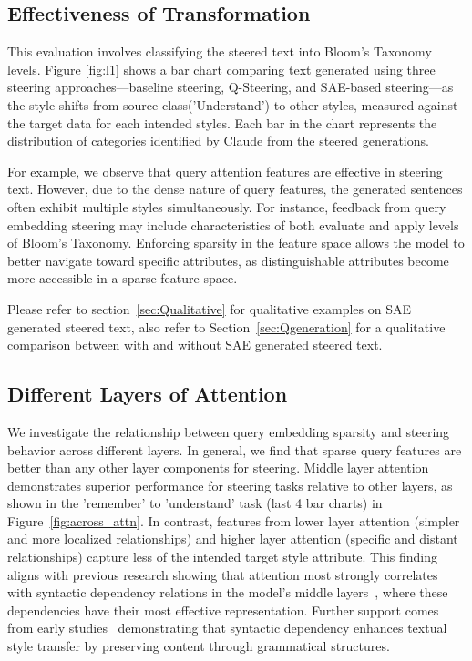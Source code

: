 \subsection{Effectiveness of Transformation}

This evaluation involves classifying the steered text into Bloom's Taxonomy levels. Figure \ref{fig:l1} shows a bar chart comparing text generated using three steering approaches—baseline steering, Q-Steering, and SAE-based steering—as the style shifts from source class('Understand') to other styles, measured against the target data for each intended styles. Each bar in the chart represents the distribution of categories identified by Claude from the steered generations.

For example, we observe that query attention features are effective in steering text. However, due to the dense nature of query features, the generated sentences often exhibit multiple styles simultaneously. For instance, feedback from query embedding steering may include characteristics of both evaluate and apply levels of Bloom's Taxonomy. Enforcing sparsity in the feature space allows the model to better navigate toward specific attributes, as distinguishable attributes become more accessible in a sparse feature space.


Please refer to section~\ref{sec:Qualitative} for qualitative examples on SAE generated steered text, also refer to Section~\ref{sec:Qgeneration} for a qualitative comparison between with and without SAE  generated steered text.












\subsection{Different Layers of Attention}

We investigate the relationship between query embedding sparsity and steering behavior across different layers. In general, we find that sparse query features are better than any other layer components for steering. Middle layer attention demonstrates superior performance for steering tasks relative to other layers, as shown in the 'remember' to 'understand' task (last 4 bar charts) in Figure~\ref{fig:across_attn}. In contrast, features from lower layer attention (simpler and more localized relationships) and higher layer attention (specific and distant relationships) capture less of the intended target style attribute. This finding aligns with previous research showing that attention most strongly correlates with syntactic dependency relations in the model's middle layers~\cite{vig2019analyzing}, where these dependencies have their most effective representation. Further support comes from early studies~\cite{hu2021syntax,gong2020rich} demonstrating that syntactic dependency enhances textual style transfer by preserving content through grammatical structures.


